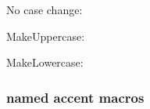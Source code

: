 \documentclass[a4paper]{article}
\begin{document}
No case change:

\begin{quote}
  \GreekAndCoptic
\end{quote}
%
MakeUppercase:
\begin{quote}
  \MakeUppercase{\GreekAndCoptic}
\end{quote}
%
MakeLowercase:
\begin{quote}
  \MakeLowercase{\GreekAndCoptic}
\end{quote}

\subsubsection{named accent macros}

\renewcommand{\GreekAndCoptic}{%
  \raggedright
  ␣  ␣  ␣  ␣  ʹ  ͵  ␣  ␣  ␣  ␣  ͺ  ␣  ␣  ␣  ;  ␣  \\
  ␣  ␣  ␣  ␣  \textnumeralsigngreek{} \textnumeralsignlowergreek{}
  ␣  ␣  ␣  ␣  { }\ypogegrammeni{} ␣  ␣  ␣  \texterotimatiko\\

  ␣  ␣  ␣  ␣  ΄  ΅  Ά  ·  Έ  Ή  Ί  ␣  Ό  ␣  Ύ  Ώ  \\
  ␣  ␣  ␣  ␣ \acctonos{ } \accdialytikatonos{ } \acctonos\textAlpha{}
  \textanoteleia{} \acctonos\textEpsilon{} \acctonos\textEta{}
  \acctonos\textIota{} ␣ \acctonos\textOmicron{} ␣ \acctonos\textUpsilon{}
  \acctonos\textOmega{} \\

  ΐ  Α  Β  Γ  Δ  Ε  Ζ  Η  Θ  Ι  Κ  Λ  Μ  Ν  Ξ  Ο  \\
  \accdialytikatonos\textiota{} \textAlpha{} \textBeta{} \textGamma{}
  \textDelta{} \textEpsilon{} \textZeta{} \textEta{} \textTheta{} \textIota{}
  \textKappa{} \textLambda{} \textMu{} \textNu{} \textXi{} \textOmicron{} \\

  Π  Ρ  ␣  Σ  Τ  Υ  Φ  Χ  Ψ  Ω  Ϊ  Ϋ  ά  έ  ή  ί  \\
  \textPi{} \textRho{} ␣ \textSigma{} \textTau{} \textUpsilon{}
  \textPhi{} \textChi{} \textPsi{} \textOmega{} \accdialytika\textIota{}
  \accdialytika\textUpsilon{} \acctonos\textalpha{} \acctonos\textepsilon{}
  \acctonos\texteta{} \acctonos\textiota{} \\

  ΰ  α  β  γ  δ  ε  ζ  η  θ  ι  κ  λ  μ  ν  ξ  ο  \\
  \accdialytikatonos\textupsilon{} \textalpha{} \textbeta{} \textgamma{}
  \textdelta{} \textepsilon{} \textzeta{} \texteta{} \texttheta{} \textiota{}
  \textkappa{} \textlambda{} \textmu{} \textnu{} \textxi{} \textomicron{} \\

}
\end{document}

